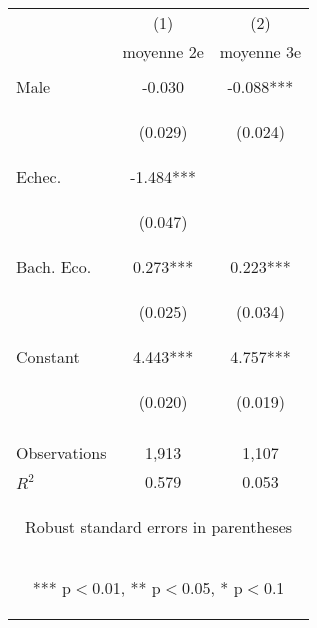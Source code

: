 \begin{center}
\begin{tabular}{lcc} \hline
 & (1) & (2) \\
 & moyenne 2e & moyenne 3e \\ \hline
\vspace{4pt} & \begin{footnotesize}\end{footnotesize} & \begin{footnotesize}\end{footnotesize} \\
Male & -0.030 & -0.088*** \\
\vspace{4pt} & \begin{footnotesize}(0.029)\end{footnotesize} & \begin{footnotesize}(0.024)\end{footnotesize} \\
Echec. & -1.484*** &  \\
\vspace{4pt} & \begin{footnotesize}(0.047)\end{footnotesize} & \begin{footnotesize}\end{footnotesize} \\
Bach. Eco. & 0.273*** & 0.223*** \\
\vspace{4pt} & \begin{footnotesize}(0.025)\end{footnotesize} & \begin{footnotesize}(0.034)\end{footnotesize} \\
Constant & 4.443*** & 4.757*** \\
 & \begin{footnotesize}(0.020)\end{footnotesize} & \begin{footnotesize}(0.019)\end{footnotesize} \\
\vspace{4pt} & \begin{footnotesize}\end{footnotesize} & \begin{footnotesize}\end{footnotesize} \\
Observations & 1,913 & 1,107 \\
 $R^2$ & 0.579 & 0.053 \\ \hline
\multicolumn{3}{c}{\begin{footnotesize} Robust standard errors in parentheses\end{footnotesize}} \\
\multicolumn{3}{c}{\begin{footnotesize} *** p$<$0.01, ** p$<$0.05, * p$<$0.1\end{footnotesize}} \\
\end{tabular}
\end{center}